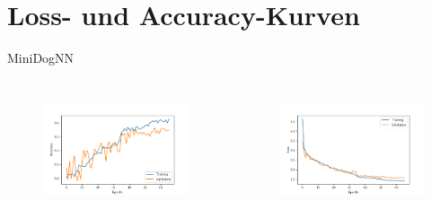   \section{Loss- und Accuracy-Kurven}

  \begin{frame}[noframenumbering]
    \tableofcontents[currentsection]
  \end{frame}

  \begin{frame}{MiniDogNN}
    \begin{columns}[c]
      \begin{figure}
        \centering
        \includegraphics[width=\textwidth]{logos/MiniDogNN/history_acc_mini.pdf}
        \label{fig:acc_mini}
      \end{figure}
      \begin{figure}
        \centering
        \includegraphics[width=\textwidth]{logos/MiniDogNN/history_loss_mini.pdf}
        \label{fig:loss_mini}
      \end{figure}
    \end{columns}
  \end{frame}

